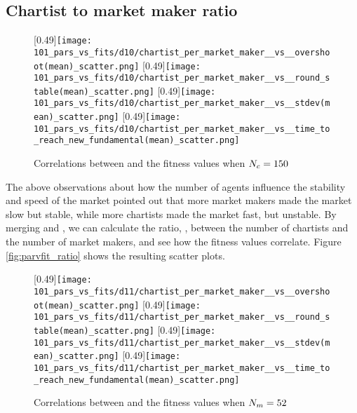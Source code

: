 \subsection{Chartist to market maker ratio}
\begin{figure}
	\centering
	\subcaptionbox{}
	[0.49\linewidth]{\texttt{[image: 101\_pars\_vs\_fits/d10/chartist\_per\_market\_maker\_\_vs\_\_overshoot(mean)\_scatter.png]}}
	\subcaptionbox{}
	[0.49\linewidth]{\texttt{[image: 101\_pars\_vs\_fits/d10/chartist\_per\_market\_maker\_\_vs\_\_round\_stable(mean)\_scatter.png]}}
	\subcaptionbox{}
	[0.49\linewidth]{\texttt{[image: 101\_pars\_vs\_fits/d10/chartist\_per\_market\_maker\_\_vs\_\_stdev(mean)\_scatter.png]}}
	\subcaptionbox{}
	[0.49\linewidth]{\texttt{[image: 101\_pars\_vs\_fits/d10/chartist\_per\_market\_maker\_\_vs\_\_time\_to\_reach\_new\_fundamental(mean)\_scatter.png]}}
	\caption{Correlations between \ratioagents and the fitness values when $N_{c} = 150$}
	\label{fig:parvfit_ratio_d10}
\end{figure}
The above observations about how the number of agents influence the stability and speed of the market pointed out that more market makers made the market slow but stable, while more chartists made the market fast, but unstable. By merging \datamatrixpar{\dten} and \datamatrixpar{\deleven}, we can calculate the ratio, \ratioagents, between the number of chartists and the number of market makers, and see how the fitness values correlate. Figure \ref{fig:parvfit_ratio} shows the resulting scatter plots. 

\begin{figure}
	\centering
	\subcaptionbox{}
	[0.49\linewidth]{\texttt{[image: 101\_pars\_vs\_fits/d11/chartist\_per\_market\_maker\_\_vs\_\_overshoot(mean)\_scatter.png]}}
	\subcaptionbox{}
	[0.49\linewidth]{\texttt{[image: 101\_pars\_vs\_fits/d11/chartist\_per\_market\_maker\_\_vs\_\_round\_stable(mean)\_scatter.png]}}
	\subcaptionbox{}
	[0.49\linewidth]{\texttt{[image: 101\_pars\_vs\_fits/d11/chartist\_per\_market\_maker\_\_vs\_\_stdev(mean)\_scatter.png]}}
	\subcaptionbox{}
	[0.49\linewidth]{\texttt{[image: 101\_pars\_vs\_fits/d11/chartist\_per\_market\_maker\_\_vs\_\_time\_to\_reach\_new\_fundamental(mean)\_scatter.png]}}
	\caption{Correlations between \ratioagents and the fitness values when $N_{m} = 52$}
	\label{fig:parvfit_ratio_d11}
\end{figure}








